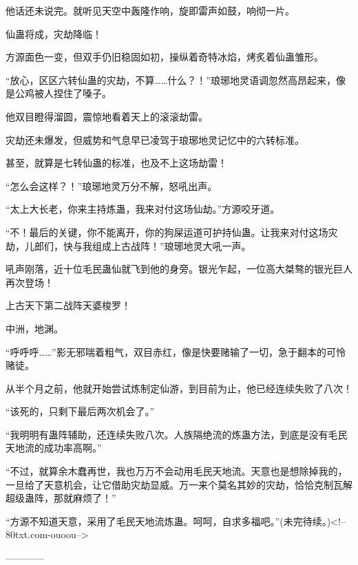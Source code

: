 \begin{this_body}
他话还未说完。就听见天空中轰隆作响，旋即雷声如鼓，响彻一片。

仙蛊将成，灾劫降临！

方源面色一变，但双手仍旧稳固如初，操纵着奇特冰焰，烤炙着仙蛊雏形。

“放心，区区六转仙蛊的灾劫，不算……什么？！”琅琊地灵语调忽然高昂起来，像是公鸡被人捏住了嗓子。

他双目瞪得溜圆，震惊地看着天上的滚滚劫雷。

灾劫还未爆发，但威势和气息早已凌驾于琅琊地灵记忆中的六转标准。

甚至，就算是七转仙蛊的标准，也及不上这场劫雷！

“怎么会这样？！”琅琊地灵万分不解，怒吼出声。

“太上大长老，你来主持炼蛊，我来对付这场仙劫。”方源咬牙道。

“不！最后的关键，你不能离开，你的狗屎运道可护持仙蛊。让我来对付这场灾劫，儿郎们，快与我组成上古战阵！”琅琊地灵大吼一声。

吼声刚落，近十位毛民蛊仙就飞到他的身旁。银光乍起，一位高大桀骜的银光巨人再次登场！

上古天下第二战阵天婆梭罗！

中洲，地渊。

“呼呼呼……”影无邪喘着粗气，双目赤红，像是快要赌输了一切，急于翻本的可怜赌徒。

从半个月之前，他就开始尝试炼制定仙游，到目前为止，他已经连续失败了八次！

“该死的，只剩下最后两次机会了。”

“我明明有蛊阵辅助，还连续失败八次。人族隔绝流的炼蛊方法，到底是没有毛民天地流的成功率高啊。”

“不过，就算余木蠢再世，我也万万不会动用毛民天地流。天意也是想除掉我的，一旦给了天意机会，让它借助灾劫显威。万一来个莫名其妙的灾劫，恰恰克制瓦解超级蛊阵，那就麻烦了！”

“方源不知道天意，采用了毛民天地流炼蛊。呵呵，自求多福吧。”(未完待续。)<!--80txt.com-ouoou-->

------------

\end{this_body}

